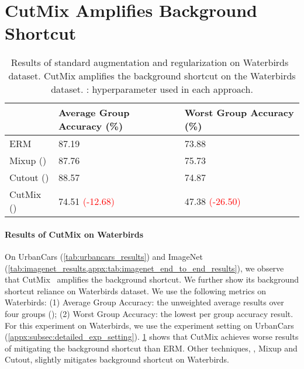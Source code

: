 \documentclass[10pt,twocolumn,letterpaper]{article}
\begin{document}
\section{CutMix Amplifies Background Shortcut}
\label{appx:sec:cutmix_amp_bg_shortcut}

\begin{table}[h]
\centering
\begin{tabular}{@{}lll@{}}
\toprule
       & Average Group Accuracy (\%) & Worst Group Accuracy (\%) \\ \midrule
ERM    & 87.19              & 73.88            \\
Mixup ()  & 87.76              & 75.73            \\
Cutout ()       & 88.57              & 74.87            \\
CutMix () & 74.51 \textcolor{red}{(-12.68)}         & 47.38 \textcolor{red}{(-26.50)}          \\ \bottomrule
\end{tabular}
\caption{Results of standard augmentation and regularization on Waterbirds~\cite{sagawa2020Int.Conf.Learn.Represent.Distributionally} dataset. CutMix amplifies the background shortcut on the Waterbirds dataset. : hyperparameter used in each approach.}
\label{appx:tab:cutmix_waterbirds}
\end{table}

\paragraph{Results of CutMix on Waterbirds} On UrbanCars (\cf \cref{tab:urbancars_results}) and ImageNet (\cf \cref{tab:imagenet_results,appx:tab:imagenet_end_to_end_results}), we observe that CutMix~\cite{yun2019IEEECVFInt.Conf.Comput.Vis.ICCVCutMix}  amplifies the background shortcut. We further show its background shortcut reliance on Waterbirds dataset. We use the following metrics on Waterbirds: (1) Average Group Accuracy: the unweighted average results over four groups (); (2) Worst Group Accuracy: the lowest per group accuracy result. For this experiment on Waterbirds, we use the experiment setting on UrbanCars (\cf \cref{appx:subsec:detailed_exp_setting}).
\cref{appx:tab:cutmix_waterbirds} shows that CutMix achieves worse results of mitigating the background shortcut than ERM. Other techniques, \ie, Mixup and Cutout, slightly mitigates background shortcut on Waterbirds.
\end{document}
